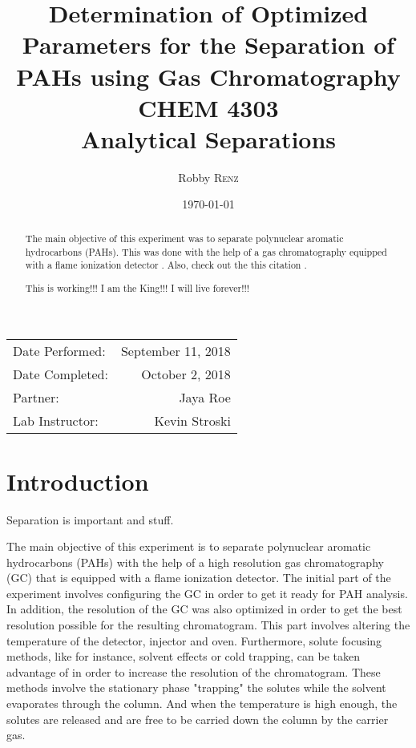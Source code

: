 \documentclass[a4paper, 12pt]{article}
\title{Determination of Optimized Parameters for the Separation of PAHs using Gas Chromatography \\ CHEM 4303 \\ Analytical Separations} %
\author{Robby \textsc{Renz}} %
\date{\today} %
\begin{document}
\maketitle %

\begin{center}
\begin{tabular}{l r}
Date Performed: & September 11, 2018 \\ %
Date Completed: & October 2, 2018 \\
Partner: & Jaya Roe \\ %
Lab Instructor: & Kevin Stroski %
\end{tabular}
\end{center}


\begin{abstract}
The main objective of this experiment was to separate polynuclear aromatic hydrocarbons (PAHs). This was done with the help of a gas chromatography equipped with a flame ionization detector \cite{Smith:2012qr}. Also, check out the this citation \cite{pah-in-soil}.

This is working!!! I am the King!!! I will live forever!!!
\end{abstract}

\newpage


\section{Introduction}
Separation is important and stuff.

The main objective of this experiment is to separate polynuclear aromatic hydrocarbons (PAHs) with the help of a high resolution gas chromatography (GC) that is equipped with a flame ionization detector. The initial part of the experiment involves configuring the GC in order to get it ready for PAH analysis. In addition, the resolution of the GC was also optimized in order to get the best resolution possible for the resulting chromatogram. This part involves altering the temperature of the detector, injector and oven. Furthermore, solute focusing methods, like for instance, solvent effects or cold trapping, can be taken advantage of in order to increase the resolution of the chromatogram. These methods involve the stationary phase "trapping" the solutes while the solvent evaporates through the column. And when the temperature is high enough, the solutes are released and are free to be carried down the column by the carrier gas.
\end{document}
